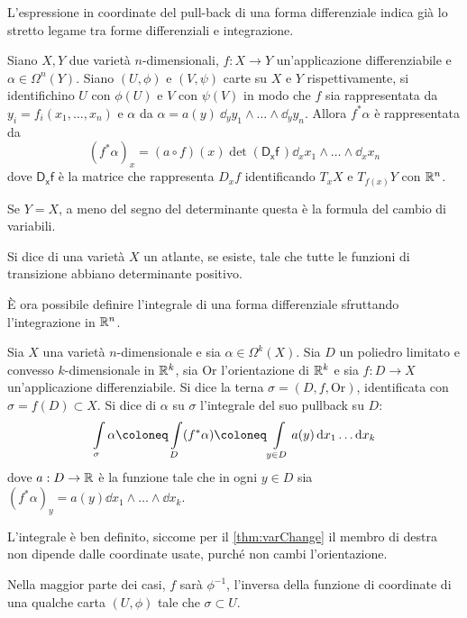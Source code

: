 L'espressione in coordinate del pull-back di una forma differenziale indica già lo stretto legame tra forme differenziali e integrazione.
\begin{theorem} \label{thm:varChange}
  Siano $X,Y$ due varietà $n$-dimensionali, $f:X\to Y$ un'applicazione differenziabile e $\alpha \in  \Omega^n(Y)$. Siano $(U, \phi)$ e $(V,\psi)$ carte su $X$ e $Y$ rispettivamente, si identifichino $U$ con $\phi(U)$ e $V$ con $\psi(V)$ in modo che $f$ sia rappresentata da $y_i = f_i(x_1, \ldots, x_n)$ e $\alpha$ da $\alpha = a(y)\ \dd_y y_1\wedge \ldots \wedge \dd_y y_n$. Allora $f^* \alpha$ è rappresentata da \begin{equation}
  (f^* \alpha)_x = (a \circ f)(x) \det(\mathsf{D_x f}\,)\dd_x x_1 \wedge \ldots \wedge \dd_x x_n
  \end{equation}
  dove $\mathsf{D_x f}$ è la matrice che rappresenta $D_x f$ identificando $T_x X$ e $T_{f(x)}Y$ con $\mathbb{R}^{n}$.
\end{theorem}
\begin{remark}
  Se $Y=X$, a meno del segno del determinante questa è la formula del cambio di variabili.
\end{remark}
\begin{definition}
  Si dice  di una varietà $X$ un atlante, se esiste, tale che tutte le funzioni di transizione abbiano determinante positivo.
\end{definition}

È ora possibile definire l'integrale di una forma differenziale sfruttando l'integrazione in $\mathbb{R}^{n}$.
\begin{definition}
  Sia $X$ una varietà $n$-dimensionale e sia $\alpha \in \Omega^k(X)$. Sia $D$ un poliedro limitato e convesso $k$-dimensionale in $\mathbb{R}^{k}$, sia $\mathrm{Or}$ l'orientazione di $\mathbb{R}^k$ e sia $f:D\to X$ un'applicazione differenziabile. Si dice  la terna $\sigma = (D,f,\mathrm{Or})$, identificata con $\sigma = f(D) \subset X$. Si dice  di $\alpha$ su $\sigma$ l'integrale del suo pullback su $D$: \begin{equation}
  \int\limits_{\sigma} \alpha \defeq \int\limits_{D} (f^* \alpha) \defeq \int\limits_{y \in D} a(y) \dd{x_1} \ldots \dd{x_k}
  \end{equation}
  dove $a: D \to \mathbb{R}$ è la funzione tale che in ogni $y \in D$ sia $(f^* \alpha)_y = a(y) \dd{x_1} \wedge \ldots \wedge \dd{x_k}$.
\end{definition}
\begin{remark}
  L'integrale è ben definito, siccome per il \autoref{thm:varChange} il membro di destra non dipende dalle coordinate usate, purché non cambi l'orientazione.
\end{remark}
\begin{remark}
  Nella maggior parte dei casi, $f$ sarà $\phi^{-1}$, l'inversa della funzione di coordinate di una qualche carta $(U,\phi)$ tale che $\sigma \subset U$.
\end{remark}

